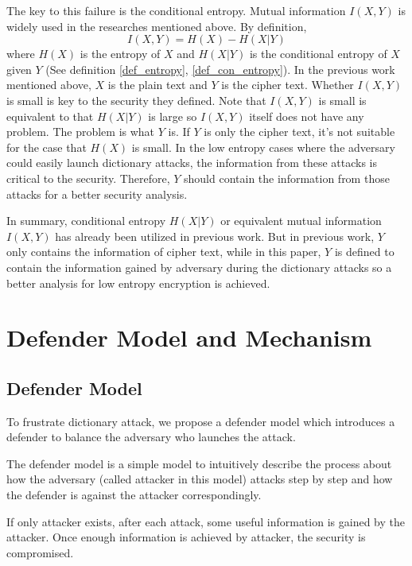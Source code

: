 \documentclass[10pt, conference, compsocconf]{IEEEtran}
\begin{document}
    The key to this failure is the conditional entropy. Mutual information
    $I(X, Y)$ is widely used in the researches mentioned above. By definition,
    \begin{equation}
        I(X, Y) = H(X) - H(X|Y)
    \end{equation}
    where $H(X)$ is the entropy of $X$ and $H(X|Y)$ is the conditional entropy
    of $X$ given $Y$ (See definition \ref{def_entropy}, \ref{def_con_entropy}).
    In the previous work mentioned above, $X$ is the plain text and $Y$ is the cipher text.
    Whether $I(X, Y)$ is small is key to the security they defined.
    Note that $I(X, Y)$ is small
    is equivalent to that $H(X|Y)$ is large so $I(X, Y)$ itself does not have any problem.
    The problem is what $Y$ is.
    If $Y$ is only the cipher text, it's not suitable for the case that $H(X)$ is small.
    In the low entropy cases where the adversary could easily launch dictionary attacks,
    the information from these attacks is critical to the security. Therefore, $Y$
    should contain the information from those attacks for a better security analysis.

    In summary, conditional entropy $H(X|Y)$ or equivalent mutual information $I(X, Y)$
    has already been utilized in previous work. But in previous work, $Y$ only
    contains the information of cipher text, while in this paper, $Y$ is defined to contain the information
    gained by adversary during the dictionary attacks so a better analysis
    for low entropy encryption is achieved.

\section{Defender Model and Mechanism}\label{sec_def}
    \subsection{Defender Model}
        To frustrate dictionary attack, we propose a
        defender model which introduces
        a defender to balance the adversary who launches the attack.

        The defender model is a simple model
        to intuitively describe the process about how the adversary
        (called attacker in this model) attacks step by step
        and how the defender is against the attacker correspondingly.

        If only attacker exists,
        after each attack, some useful information is gained by the attacker.
        Once enough information is achieved by attacker,
        the security is compromised.
\end{document}
